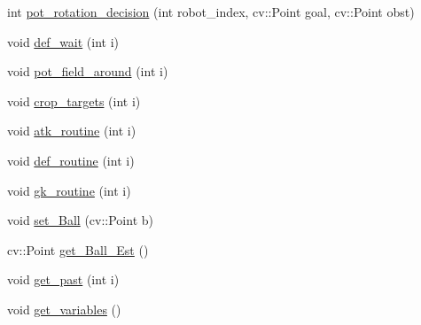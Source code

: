 \begin{DoxyCompactItemize}
\item 
int \hyperlink{class_strategy_abc4ef2ab65f3864218c1736d7c35d46a}{pot\+\_\+rotation\+\_\+decision} (int robot\+\_\+index, cv\+::\+Point goal, cv\+::\+Point obst)
\item 
void \hyperlink{class_strategy_a636339a7d8b809c6bbfb67e0942ae052}{def\+\_\+wait} (int i)
\item 
void \hyperlink{class_strategy_aef2ebe9a76fdb114d547f024e332b3d3}{pot\+\_\+field\+\_\+around} (int i)
\item 
void \hyperlink{class_strategy_a641f0314f2b05faa6d6838351a479f38}{crop\+\_\+targets} (int i)
\item 
void \hyperlink{class_strategy_a7af0ec883fe9e80c31cf030ce203f956}{atk\+\_\+routine} (int i)
\item 
void \hyperlink{class_strategy_a304c52736ec76d275adda7eeacdd430c}{def\+\_\+routine} (int i)
\item 
void \hyperlink{class_strategy_a0e93b877f1da0c7a608c5641812f54d4}{gk\+\_\+routine} (int i)
\item 
void \hyperlink{class_strategy_a7119e796ed0218f4e44418fea1efdf49}{set\+\_\+\+Ball} (cv\+::\+Point b)
\item 
cv\+::\+Point \hyperlink{class_strategy_a08e53a7b4e9239e2536dcdbf2cc6abf5}{get\+\_\+\+Ball\+\_\+\+Est} ()
\item 
void \hyperlink{class_strategy_aca1d4847c7663f25e643a5ec3d467da8}{get\+\_\+past} (int i)
\item 
void \hyperlink{class_strategy_aa292ccd0034d6507ffa7d5dc35862a94}{get\+\_\+variables} ()
\end{DoxyCompactItemize}
